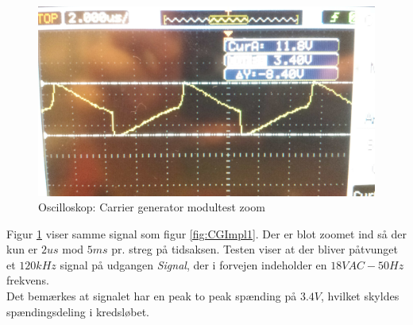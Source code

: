 \begin{figure}[h]
	\centering
	\includegraphics[width={\textwidth - 1 cm}, trim=0 0 0 0, clip=true]{../Implementering/billeder/CGImpl2.jpg}
	\caption{Oscilloskop: Carrier generator modultest zoom }
	\label{fig:CGImpl2}
\end{figure}

\newpage

Figur \ref{fig:CGImpl2} viser samme signal som figur \ref{fig:CGImpl1}. Der er blot zoomet ind så der kun er $2us$ mod $5ms$ pr. streg på tidsaksen. Testen viser at der bliver påtvunget et $120kHz$ signal på udgangen \textit{Signal}, der i forvejen indeholder en $18VAC - 50Hz$ frekvens.\\
Det bemærkes at signalet har en peak to peak spænding på $3.4V$, hvilket skyldes spændingsdeling i kredsløbet.